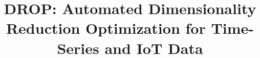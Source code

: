 \documentclass{sig-alternate}
\theoremstyle{definition}
\begin{document}
%


\title{DROP: Automated Dimensionality Reduction Optimization for Time-Series and IoT Data}

{\author{}}
\maketitle












 

\balance
\end{document}
